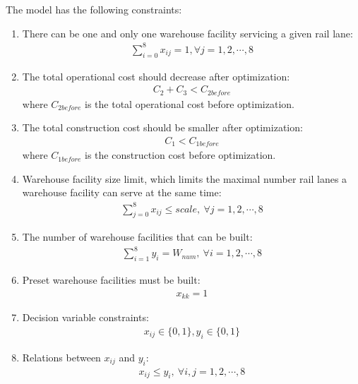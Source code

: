 The model has the following constraints:
\begin{enumerate}
	\item There can be one and only one warehouse facility servicing a given rail lane: 
	\begin{align}
		\sum_{i = 0}^8 x_{ij} = 1, \forall j = 1, 2, \cdots, 8
	\end{align}
	\item The total operational cost should decrease after optimization:
	\begin{align}
		C_2 + C_3 < C_{2before}
	\end{align}
	where $C_{2before}$ is the total operational cost before optimization.
	\item The total construction cost should be smaller after optimization:
	\begin{align}
		C_1 < C_{1before}
	\end{align}
	where $C_{1before}$ is the construction cost before optimization.
	\item Warehouse facility size limit, which limits the maximal number rail lanes a warehouse facility can serve at the same time:
	\begin{align}
		\sum_{j = 0}^8 x_{ij} \leq scale, \ \forall j = 1, 2, \cdots, 8
	\end{align}
	\item The number of warehouse facilities that can be built:
	\begin{align}
		\sum_{i = 1}^8 y_i = W_{num}, \ \forall i = 1, 2, \cdots, 8
	\end{align}
	\item Preset warehouse facilities must be built:
	\begin{align}
		x_{kk} = 1
	\end{align}
	\item Decision variable constraints:
	\begin{align}
		x_{ij} \in \{0, 1\}, y_i \in \{0, 1\}
	\end{align}
	\item Relations between $x_{ij}$ and $y_i$:
	\begin{align}
		x_{ij} \leq y_i, \ \forall i,j = 1, 2, \cdots, 8
	\end{align}
\end{enumerate}